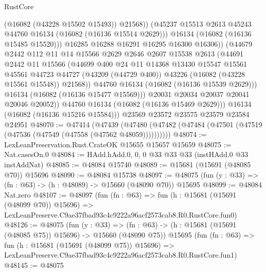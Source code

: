 \begin{lexlean}{RustCore}
\begin{coremodule}
                        (@16082 (@43228 @15502 @15493))
                        @21568))
                    (@45237 @15513 @2613 @45243 @44760 @16134 (@16082 (@16136 @15514 @2629)))
                    @16134
                    (@16082 (@16136 @15485 @15520)))
                  @16285
                  @16288
                  @16291
                  @16295
                  @16300
                  @16306))
              (@44679
                @2442
                @112
                @11
                @14
                @15566
                @2629
                @2646
                @2607
                @15538
                @2613
                (@44691
                  @2442
                  @11
                  @15566
                  (@44699
                    @400
                    @24
                    @11
                    @14368
                    @13430
                    @15547
                    @15561
                    @45561
                    @44723
                    @44727
                    (@43209 (@44729 @400))
                    @43226
                    (@16082 (@43228 @15561 @15548))
                    @21568))
                @44760
                @16134
                (@16082 (@16136 @15539 @2629)))
              @16134
              (@16082 (@16136 @15477 @15569)))
            @20031
            @20034
            @20037
            @20041
            @20046
            @20052))
        @44760
        @16134
        (@16082 (@16136 @15469 @2629)))
      @16134
      (@16082 (@16136 @15216 @15584)))
    @23569
    @23572
    @23575
    @23579
    @23584
    @24951
@48070 := @47414
    (@47439 (@47480 (@47482 (@47484 (@47501 (@47519 (@47536 (@47549 (@47558 (@47562 @48059))))))))))
@48074 := LexLeanPreservation.Rust.CrateOK @15655 @15657 @15659
@48075 := Nat.casesOn.{0}
@48084 := HAdd.hAdd.{0, 0, 0} @33 @33 @33 (instHAdd.{0} @33 instAddNat)
@48085 := @48084 @15740
@48089 := @15681 (@15691 (@48085 @70)) @15696
@48090 := @48084 @15738
@48097 := @48075 (fun (y : @33) => (fn : @63) -> (h : @48089) -> @15660 (@48090 @70)) @15695
@48099 := @48084 Nat.zero
@48107 := @48097
    (fun (fn : @63) =>
    fun (h : @15681 (@15691 (@48099 @70)) @15696) =>
    LexLeanPreserve.C9ae37fbad93c4c9222a96acf2573cab8.R0.RustCore.fun0)
@48126 := @48075
    (fun (y : @33) =>
    (fn : @63) -> (h : @15681 (@15691 (@48085 @75)) @15696) -> @15660 (@48090 @75))
    @15695
    (fun (fn : @63) =>
    fun (h : @15681 (@15691 (@48099 @75)) @15696) =>
    LexLeanPreserve.C9ae37fbad93c4c9222a96acf2573cab8.R0.RustCore.fun1)
@48145 := @48075

\end{coremodule}
\end{lexlean}

